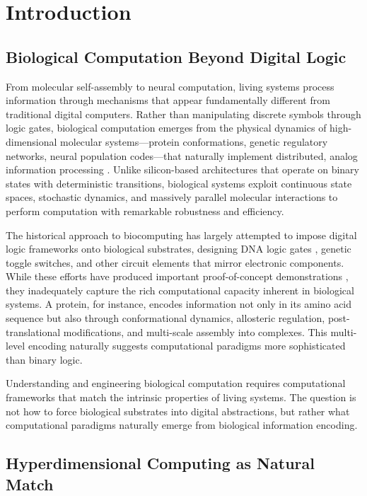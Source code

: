 \documentclass[12pt]{article}
\begin{document}
\section{Introduction}

\subsection{Biological Computation Beyond Digital Logic}

From molecular self-assembly to neural computation, living systems process information through mechanisms that appear fundamentally different from traditional digital computers. Rather than manipulating discrete symbols through logic gates, biological computation emerges from the physical dynamics of high-dimensional molecular systems—protein conformations, genetic regulatory networks, neural population codes—that naturally implement distributed, analog information processing \citep{Adamatzky2016}. Unlike silicon-based architectures that operate on binary states with deterministic transitions, biological systems exploit continuous state spaces, stochastic dynamics, and massively parallel molecular interactions to perform computation with remarkable robustness and efficiency.

The historical approach to biocomputing has largely attempted to impose digital logic frameworks onto biological substrates, designing DNA logic gates \citep{Qian2011}, genetic toggle switches, and other circuit elements that mirror electronic components. While these efforts have produced important proof-of-concept demonstrations \citep{Nielsen2016}, they inadequately capture the rich computational capacity inherent in biological systems. A protein, for instance, encodes information not only in its amino acid sequence but also through conformational dynamics, allosteric regulation, post-translational modifications, and multi-scale assembly into complexes. This multi-level encoding naturally suggests computational paradigms more sophisticated than binary logic.

Understanding and engineering biological computation requires computational frameworks that match the intrinsic properties of living systems. The question is not how to force biological substrates into digital abstractions, but rather what computational paradigms naturally emerge from biological information encoding.

\subsection{Hyperdimensional Computing as Natural Match}
\end{document}
